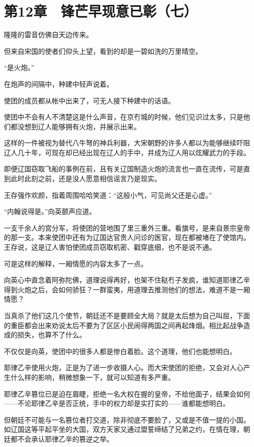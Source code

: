 \section{第12章　锋芒早现意已彰（七）}

隆隆的雷音仿佛自天边传来。

但来自宋国的使者们仰头上望，看到的却是一碧如洗的万里晴空。

“是火炮。”

在炮声的间隔中，种建中轻声说着。

使团的成员都从帐中出来了，可无人接下种建中的话语。

使团中不会有人不清楚这是什么声音，在京冇城的时候，他们见识过太多，只是他们都没想到辽人能够拥有火炮，并展示出来。

这样的一件被视为替代八牛弩的神兵利器，大宋朝野的许多人都以为能够继续吓阻辽人几十年，可现在却已经出现在辽人的手中，并成为辽人用以炫耀武力的手段。

即便辽国窃取飞船的事例在前，且有关辽国制造火炮的流言也一直在流传，可是直到此时此刻之前，还是没人愿意相信谣言乃是现实。

王存强作欢颜，指着周围哈哈笑道：“这般小气，可见尚父还是心虚。”

“内翰说得是。”向英颤声应道。

一支千余人的宫分军，将使团的营地围了里三重外三重。看旗号，是来自景宗皇帝的那一支。本来使团中还有为辽国达官贵人问诊的医官，现在都被堵在了使馆内。王存说，这是辽人害怕使团成员窃取机密、戳穿底细，也不是说不通。

可是这样的解释，一厢情愿的内容太多了一点。

向英心中直念着阿弥陀佛，道理说得再好，也架不住鞑冇子发疯，谁知道耶律乙辛得到火炮之后，会如何骄狂？一群蛮夷，用道理去推测他们的想法，难道不是一厢情愿？

当真杀了他们这几个使节，朝廷还不是要顾全大局？就是太后想为自己叫屈，下面的重臣都会出来劝说太后不要为了区区小民闹得两国之间再起烽烟。相比起战争造成的损失，也算不了什么。

不仅仅是向英，使团中的很多人都是惨白着脸。这个道理，他们也能想明白。

耶律乙辛使用火炮，正是为了进一步收摄人心。而大宋使团的拒绝，又会对人心产生什么样的影响，稍微想象一下，就可以知道有多严重。

耶律乙辛篡位已是迫在眉睫，拒绝一名大权在握的皇帝，不给他面子，结果会如何——不论耶律乙辛是否正统，手中的权力却是实打实的——谁都能想明白。

但朝廷不可能与一名篡位者打交道，除非彻底不要脸了，又或是不值一提的小国。如辽国这等平起平坐的大国，双方天家又通过盟誓缔结了兄弟之约，在情在理，朝廷都不会承认耶律乙辛的篡逆之举。

